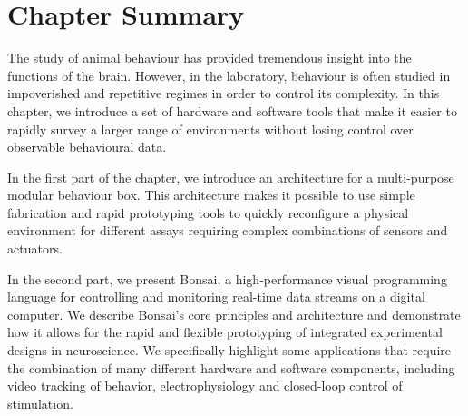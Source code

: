 				
\section{Chapter Summary}

The study of animal behaviour has provided tremendous insight into the functions of the brain. However, in the laboratory, behaviour is often studied in impoverished and repetitive regimes in order to control its complexity. In this chapter, we introduce a set of hardware and software tools that make it easier to rapidly survey a larger range of environments without losing control over observable behavioural data.

In the first part of the chapter, we introduce an architecture for a multi-purpose modular behaviour box. This architecture makes it possible to use simple fabrication and rapid prototyping tools to quickly reconfigure a physical environment for different assays requiring complex combinations of sensors and actuators.

In the second part, we present Bonsai, a high-performance visual programming language for controlling and monitoring real-time data streams on a digital computer. We describe Bonsai's core principles and architecture and demonstrate how it allows for the rapid and flexible prototyping of integrated experimental designs in neuroscience. We specifically highlight some applications that require the combination of many different hardware and software components, including video tracking of behavior, electrophysiology and closed-loop control of stimulation.

\pagebreak


